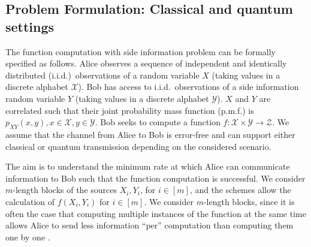 \documentclass[journal, onecolumn, draftcls]{IEEEtran}
\theoremstyle{definition}
\newcommand{\calX}{\mathcal{X}}
\newcommand{\calY}{\mathcal{Y}}
\newcommand{\calZ}{\mathcal{Z}}
\begin{document}
\subsection{Problem Formulation: Classical and quantum settings}\label{subsec:problem_formulation}
The function computation with side information problem can be formally specified as follows. Alice observes a sequence of independent and identically distributed (i.i.d.)~observations of a random variable $X$ (taking values in a discrete alphabet $\calX$). Bob has access to i.i.d.~observations of a side information random variable $Y$ (taking values in a discrete alphabet $\calY$). $X$ and $Y$ are correlated such that their joint probability mass function (p.m.f.) is $p_{XY}(x,y), x \in \calX, y \in \calY$. Bob seeks to compute a function $f: \calX \times \calY \to \calZ$.  We assume that the channel from Alice to Bob is error-free and can support either classical or quantum transmission depending on the considered scenario.




The aim is to understand the minimum rate at which Alice can communicate information to Bob such that the function computation is successful. We consider $m$-length blocks of the sources $X_i, Y_i$, for $i \in [m]$, and the schemes allow the calculation of $f(X_i, Y_i)$ for $i \in [m]$. We consider $m$-length blocks, since it is often the case that computing multiple instances of the function at the same time allows Alice to send less information ``per'' computation than computing them one by one \cite{shannon1956zero}.
\end{document}
